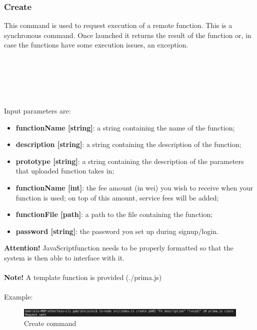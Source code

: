 \subsubsection{Create}
This command is used to request execution of a remote function. This is a synchronous command. Once launched it returns the result of the function or, in case the functions have some execution issues, an exception.\\\\
\centerline{}\\\\
\\\\
Input parameters are:
\begin{itemize}
	\item \textbf{functionName [string]}: a string containing the name of the function;
	\item \textbf{description [string]}: a string containing the description of the function;
	\item \textbf{prototype [string]}: a string containing the description of the parameters that uploaded function takes in;
	\item \textbf{functionName [int]}: the fee amount (in wei) you wish to receive when your function is used; on top of this amount, service fees will be added;
	\item \textbf{functionFile [path]}: a path to the file containing the function;
	\item \textbf{password [string]}: the password you set up during signup/login.
\end{itemize}
\textbf{Attention!} JavaScript\glo function needs to be properly formatted so that the system is then able to interface with it.\\\\
\textbf{Note!} A template function is provided (./prima.js)\\\\
Example:
\begin{figure}[h]
	\centering
	\includegraphics[width=\textwidth]{res/img/Screenshot_deploy.png}
	\caption{Create command}
\end{figure}
